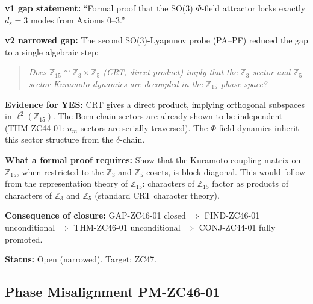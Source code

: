 \documentclass[12pt, a4paper]{article}
\begin{document}
\begin{openqbox}[title={GAP-ZC46-01: CRT Sector Independence
  $\Rightarrow$ Kuramoto Decoupling (Narrowed in v2)}]

\textbf{v1 gap statement:}
``Formal proof that the SO(3) $\Phi$-field attractor locks
exactly $d_s = 3$ modes from Axioms 0--3.''

\textbf{v2 narrowed gap:}
The second SO(3)-Lyapunov probe (PA--PF) reduced the gap to a
single algebraic step:

\begin{quote}
\emph{Does $\mathbb{Z}_{15} \cong \mathbb{Z}_3 \times \mathbb{Z}_5$
(CRT, direct product) imply that the $\mathbb{Z}_3$-sector and
$\mathbb{Z}_5$-sector Kuramoto dynamics are decoupled in the
$\mathbb{Z}_{15}$ phase space?}
\end{quote}

\textbf{Evidence for YES:}
CRT gives a direct product, implying orthogonal subspaces in
$\ell^2(\mathbb{Z}_{15})$. The Born-chain sectors are already
shown to be independent (THM-ZC44-01: $n_m$ sectors are
serially traversed). The $\Phi$-field dynamics inherit this sector
structure from the $\delta$-chain.

\textbf{What a formal proof requires:}
Show that the Kuramoto coupling matrix on $\mathbb{Z}_{15}$,
when restricted to the $\mathbb{Z}_3$ and $\mathbb{Z}_5$
cosets, is block-diagonal. This would follow from the
representation theory of $\mathbb{Z}_{15}$: characters of
$\mathbb{Z}_{15}$ factor as products of characters of
$\mathbb{Z}_3$ and $\mathbb{Z}_5$ (standard CRT character theory).

\textbf{Consequence of closure:}
GAP-ZC46-01 closed $\Rightarrow$ FIND-ZC46-01 unconditional
$\Rightarrow$ THM-ZC46-01 unconditional
$\Rightarrow$ CONJ-ZC44-01 fully promoted.

\textbf{Status:} Open (narrowed). Target: ZC47.
\end{openqbox}

\subsection{Phase Misalignment PM-ZC46-01}

\end{document}
